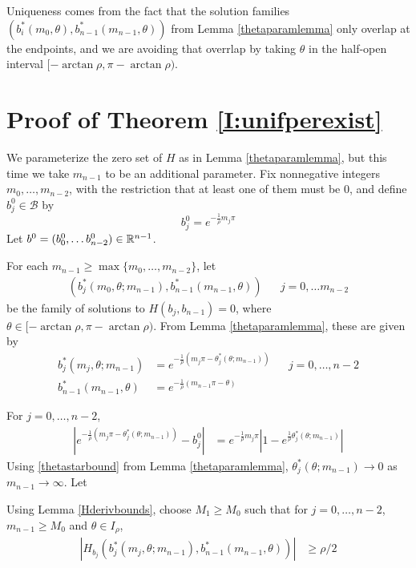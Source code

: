 \documentclass[thesis.tex]{subfiles}
\begin{document}
Uniqueness comes from the fact that the solution families $(b_i^*(m_0, \theta), b_{n-1}^*(m_{n-1}, \theta))$ from Lemma \eqref{thetaparamlemma} only overlap at the endpoints, and we are avoiding that overrlap by taking $\theta$ in the half-open interval $[-\arctan \rho, \pi - \arctan \rho)$. 

\section{Proof of Theorem \ref{I:unifperexist}}

We parameterize the zero set of $H$ as in Lemma \ref{thetaparamlemma}, but this time we take $m_{n-1}$ to be an additional parameter. Fix nonnegative integers $m_0, \dots, m_{n-2}$, with the restriction that at least one of them must be 0, and define $b_j^0 \in \mathcal{B}$ by
\[
b_j^0 = e^{-\frac{1}{\rho}m_j \pi}
\]
Let $b^0 = (b_0^0, \dots b_{n-2}^0) \in {\mathbb R}^{n-1}$.


For each $m_{n-1} \geq \max\{ m_0, \dots, m_{n-2} \}$, let
\begin{align}
(b_j^*(m_0, \theta; m_{n-1}), b_{n-1}^*(m_{n-1}, \theta)) && j = 0, \dots m_{n-2}
\end{align}
be the family of solutions to $H(b_j, b_{n-1}) = 0$, where $\theta \in [-\arctan \rho, \pi - \arctan \rho)$. From Lemma \ref{thetaparamlemma}, these are given by
\begin{equation}\label{bstarm}
\begin{aligned}
b_j^*(m_j, \theta; m_{n-1}) &= e^{-\frac{1}{\rho}(m_j \pi - \theta_j^*(\theta; m_{n-1}))} && j = 0, \dots, n-2 \\
b_{n-1}^*(m_{n-1}, \theta) &= e^{-\frac{1}{\rho}(m_{n-1}\pi - \theta)}
\end{aligned}
\end{equation}

For $j = 0, \dots, n-2$,
\begin{align*}
| e^{-\frac{1}{\rho}(m_j \pi - \theta_j^*(\theta; m_{n-1}))} - b_j^0 |
&= e^{-\frac{1}{\rho}m_j \pi}| 1 - e^{\frac{1}{\rho} \theta_j^*(\theta; m_{n-1})}| 
\end{align*}
Using \eqref{thetastarbound} from Lemma \ref{thetaparamlemma}, $\theta_j^*(\theta; m_{n-1}) \rightarrow 0$ as $m_{n-1} \rightarrow \infty$. Let 

Using Lemma \ref{Hderivbounds}, choose $M_1 \geq M_0$ such that for $j = 0, \dots, n-2$, $m_{n-1} \geq M_0$ and $\theta \in I_\rho$,
\begin{align}\label{derivbound1}
| H_{b_j}(b_j^*(m_j, \theta; m_{n-1}), b_{n-1}^*(m_{n-1}, \theta)) | &\geq \rho/2
\end{align}
\end{document}
